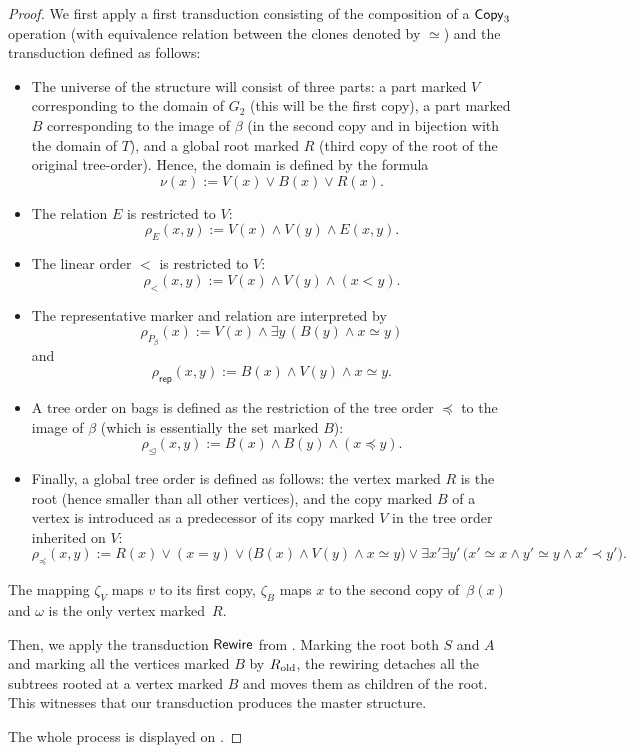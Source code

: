 \documentclass[1p,number,11pt]{elsarticle}
\theoremstyle{plain}
\newcommand{\is}{\mathrel{:=}}
\DeclareMathOperator{\rew}{{\sf Rewire}}
\begin{document}
\begin{proof}
    We first apply a first transduction consisting of the composition of a ${\sf Copy}_3$ operation (with equivalence relation between the clones denoted by $\simeq$) and the transduction defined as follows:
\begin{itemize}
    \item The universe of the structure will consist of three parts: a part marked $V$ corresponding to the domain of $G_2$ (this will be the first copy), a part marked $B$ corresponding to the image of $\beta$ (in the second copy and in bijection with the domain of $T$), and a global root marked $R$ (third copy of the root of the original tree-order). Hence, the domain is defined by the formula 
    \[
    \nu(x):=V(x)\vee B(x)\vee R(x).
    \]
    \item The relation $E$ is restricted to $V$:
    \[
    \rho_E(x,y):=V(x)\wedge V(y)\wedge E(x,y).
    \]
    \item The linear order $<$ is restricted to $V$:
    \[
    \rho_<(x,y):=V(x)\wedge V(y)\wedge (x<y).
    \]   
    \item The representative marker and relation are interpreted by
    \[
      \rho_{P_\beta}(x):=V(x)\wedge
         \exists y\,(B(y)\wedge x\simeq y)
    \]
    and
    \[
      \rho_{\mathsf{rep}}(x,y):=
         B(x)\wedge V(y)\wedge x\simeq y.
    \]
    \item A tree order on bags is defined as the restriction of the tree order $\preceq$ to the image of $\beta$ (which is essentially the set marked $B$):
    \[
    \rho_{\unlhd}(x,y):=B(x)\wedge B(y)\wedge (x\preceq y).
    \]
    \item Finally, a global tree order is defined as follows: the vertex marked $R$ is the root (hence smaller than all other vertices), and the copy marked $B$ of a vertex is introduced as a predecessor of its copy marked $V$ in the tree order inherited on $V$:
    \[
    \rho_\preceq(x,y)\is R(x)\vee (x=y)
      \vee \bigl(B(x)\wedge V(y)\wedge x\simeq y\bigr)
      \vee \exists x'\exists y'\,
        \bigl(x'\simeq x\wedge y'\simeq y\wedge x'\prec y'\bigr).
    \]
\end{itemize}
    The mapping $\zeta_V$ maps $v$ to its first copy, $\zeta_B$ maps $x$ to the second copy of~$\beta(x)$ and $\omega$ is the only vertex marked~$R$.

    Then, we apply the transduction $\rew$ from .
    Marking the root both $S$ and $A$ and marking all the vertices marked $B$ by $R_{\rm old}$, the rewiring detaches all the subtrees rooted at a vertex marked $B$ and moves them as  children of the root. This witnesses that our transduction produces the master structure.

    The whole process is displayed on . 
    \end{proof}
    
\end{document}
